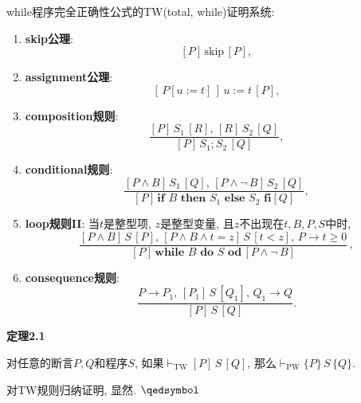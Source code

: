 \documentclass[UTF8]{ctexart}
\begin{document}
while程序完全正确性公式的TW(total, while)证明系统:
\begin{enumerate}
    \item \textbf{skip公理}:
    \[
        [P]\,\mathrm{skip}\,[P],
    \]
    \item \textbf{assignment公理}:
    \[
        [\,P[u:=t]\,]\,u:=t\,[P],
    \]
    \item \textbf{composition规则}:
    \[
        \frac{[P]\,S_1\,[R],\,[R]\,S_2\,[Q]}
        {[P]\,S_1;S_2\,[Q]},
    \]
    \item \textbf{conditional规则}:
    \[
        \frac{[P\land B]\,S_1\,[Q],\,[P\land\neg\,B]\,S_2\,[Q]}
        {[P]\,\mathbf{if}\,\,B\,\,\mathbf{then}\,\,S_1\,\,\mathbf{else}
        \,\,S_2\,\,\mathbf{fi}[Q]},
    \]
    \item \textbf{loop规则II}: 当$t$是整型项, $z$是整型变量,
    且$z$不出现在$t,B,P,S$中时,
    \vspace{5pt}
    \[
        \frac{[P\land B]\,S\,[P],\,[P\land B\land t=z]\,S\,[t<z],\,
        P\to t\geqslant 0}
        {[P]\,\mathbf{while}\,\,B\,\,\mathbf{do}\,\,S\,\,\mathbf{od}\,
        [P\land\neg\,B]}\,,
    \]
    \item \textbf{consequence规则}:
    \[
        \frac{P\to P_1,\,[P_1]\,S\,[Q_1],\,Q_1\to Q}
        {[P]\,S\,[Q]}.
    \]
\end{enumerate}

\vspace{15pt}

\hypertarget{sec:定理2.1}{}
\noindent\textbf{定理2.1}

对任意的断言$P,Q$和程序$S$, 如果$\vdash_{\mathrm{TW}}[P]\,S\,[Q]$,
那么$\vdash_{\mathrm{PW}}\{P\}\,S\,\{Q\}$.


对TW规则归纳证明, 显然. \hfill $\qedsymbol$
\end{document}
